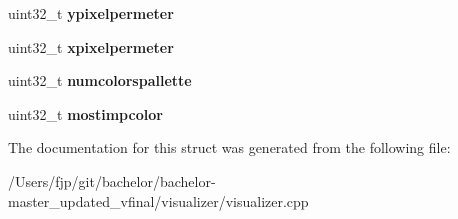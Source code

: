 \begin{DoxyCompactItemize}
uint32\+\_\+t {\bfseries ypixelpermeter}
\item 
\mbox{\label{structvisualizer_1_1_bitmap_info_header_a55f795ae6a8f855cbc3a9cad8d69b091}} 
uint32\+\_\+t {\bfseries xpixelpermeter}
\item 
\mbox{\label{structvisualizer_1_1_bitmap_info_header_a828bf1dbc3f160913e1a835ad007056b}} 
uint32\+\_\+t {\bfseries numcolorspallette}
\item 
\mbox{\label{structvisualizer_1_1_bitmap_info_header_a3569cfb8679eec61adfa907348e5c898}} 
uint32\+\_\+t {\bfseries mostimpcolor}
\end{DoxyCompactItemize}


The documentation for this struct was generated from the following file\+:\begin{DoxyCompactItemize}
\item 
/\+Users/fjp/git/bachelor/bachelor-\/master\+\_\+updated\+\_\+vfinal/visualizer/visualizer.\+cpp\end{DoxyCompactItemize}
